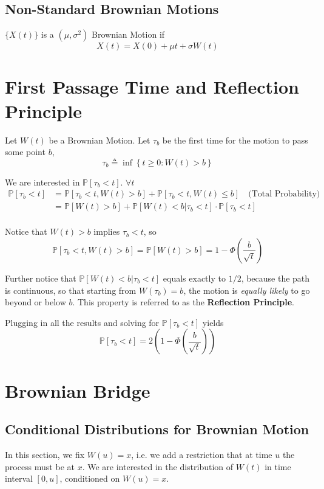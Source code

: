     \subsection{Non-Standard Brownian Motions}
        \begin{definition}
            $\{X(t)\}$ is a $(\mu, \sigma^2)$ Brownian Motion if
            \[ X(t) = X(0) + \mu t + \sigma W(t) \]
        \end{definition}


\section{First Passage Time and Reflection Principle}
    Let $W(t)$ be a Brownian Motion. Let $\tau_b$ be the first time for the motion to pass some point $b$,
    \[ \tau_b \triangleq \inf\left\{ t \ge 0 : W(t) > b \right\} \]

    We are interested in $\mathbb{P}[\tau_b < t]$. $\forall t$
    \begin{align*}
        \mathbb{P}[\tau_b < t] &= \mathbb{P}[\tau_b < t, W(t) > b] + \mathbb{P}[\tau_b < t, W(t) \le b] \quad \text{(Total Probability)}\\
        &= \mathbb{P}[W(t) > b] + \mathbb{P}[W(t) < b | \tau_b < t]\cdot\mathbb{P}[\tau_b < t]\\
    \end{align*}

    Notice that $W(t) > b$ implies $\tau_b < t$, so
    \[ \mathbb{P}[\tau_b < t, W(t) > b] = \mathbb{P}[W(t) > b] = 1 - \Phi(\frac{b}{\sqrt{t}}) \]

    Further notice that $\mathbb{P}[W(t) < b | \tau_b < t]$ equals exactly to $1/2$, because the path is continuous, so that starting from $W(\tau_b) = b$, the motion is \emph{equally likely} to go beyond or below $b$. This property is referred to as the \textbf{Reflection Principle}.

    Plugging in all the results and solving for $\mathbb{P}[\tau_b < t]$ yields
    \[ \mathbb{P}[\tau_b < t] = 2 \left( 1 - \Phi\left(\frac{b}{\sqrt{t}}\right) \right) \]


\section{Brownian Bridge}
    \subsection{Conditional Distributions for Brownian Motion}
        In this section, we fix $W(u) = x$, i.e. we add a restriction that at time $u$ the process must be at $x$. We are interested in the distribution of $W(t)$ in time interval $[0,u]$, conditioned on $W(u)=x$.

